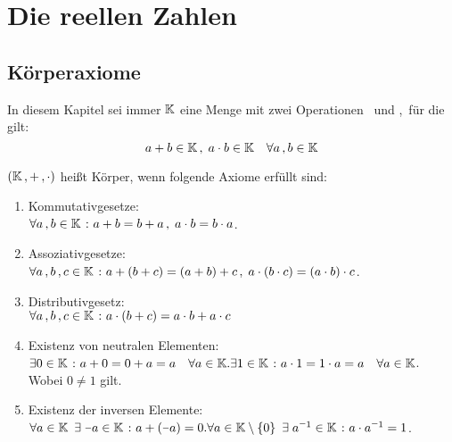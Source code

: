 \documentclass[../ana1.tex]{subfiles}
\begin{document}
\setcounter{section}{2}

\section{Die reellen Zahlen}

\subsection{Körperaxiome}
\begin{prosa}
	In diesem Kapitel sei immer \(\mathbb{K}\) eine Menge mit zwei Operationen \gqq{\(+\)}\, und 
	\gqq{\(\cdot\)},\, für die gilt:
	\[a + b \in \mathbb{K} \operatorname{,} \; a \cdot b \in \mathbb{K} \quad \forall a \operatorname{,} b \in \mathbb{K}\]
\end{prosa}

\begin{defi}[Körperaxiome]
	\((\mathbb{K} \operatorname{,} + \operatorname{,} \cdot)\) heißt Körper, wenn folgende Axiome erfüllt sind:
	\begin{enumerate}[label= (K\arabic*)]
		\item\label{ax:K1}Kommutativgesetze:\\
			  \(\forall a \operatorname{,} b \in \mathbb{K} \; \colon a+b=b+a \operatorname{,} \; a \cdot b = b \cdot a\).
		\item\label{ax:K2}Assoziativgesetze:\\
			  \(\forall a \operatorname{,} b \operatorname{,} c \in \mathbb{K} \; \colon a+(b+c) = (a+b)+c \operatorname{,} \; a \cdot (b \cdot c) = (a \cdot b)\cdot c\).
		\item\label{ax:K3}Distributivgesetz:\\
			  \(\forall a \operatorname{,} b \operatorname{,} c \in \mathbb{K} \; \colon a \cdot (b+c) = a \cdot b + a \cdot c\)
		\item\label{ax:K4}Existenz von neutralen Elementen:\\
			  \(\exists 0 \in \mathbb{K} \; \colon a + 0 = 0 + a = a \quad \forall a \in \mathbb{K}.\\
				\exists 1 \in \mathbb{K} \; \colon a \cdot 1 = 1 \cdot a = a \quad \forall a \in \mathbb{K}\).\\
			  Wobei \(0 \neq 1\) gilt. 
		\item\label{ax:K5}Existenz der inversen Elemente:\\
		      \(\forall a \in \K \enspace \exists \; \minus a \in \K \; \colon a + (\minus a) = 0.\\
			    \forall a \in \K \setminus \set{0} \enspace \exists \; a^{\minus 1} \in \K \; \colon a \cdot a^{\minus 1} = 1\).\\
	\end{enumerate}
\end{defi}
\end{document}
